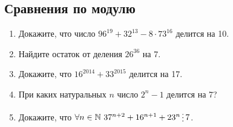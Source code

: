 \documentclass[11pt]{article}
\begin{document}
    \subsection*{Сравнения по модулю}
    \begin{enumerate}[start=11,label={\bfseries \arabic*.}]
        \item Докажите, что число $96^{19} + 32^{13} - 8 \cdot 73^{16}$ делится на 10.
        \item Найдите остаток от деления $26^{36}$ на 7.

        \item Докажите, что $16^{2014} + 33^{2015}$ делится на 17.

        \item При каких натуральных $n$ число $2^n - 1$ делится на 7?

        \item Докажите, что $\forall n \in \mathbb{N} \ 37^{n + 2} + 16^{n + 1} + 23^{n} \divisible 7$.
    \end{enumerate}
\end{document}
